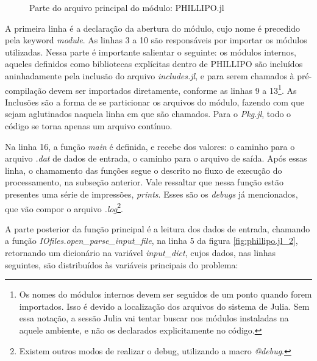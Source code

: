 \begin{figure}[hbtp]
    \caption{Parte do arquivo principal do módulo: PHILLIPO.jl}
    
    \label{fig:phillipo.jl}
\end{figure}

A primeira linha é a declaração da abertura do módulo, cujo nome é precedido pela keyword \emph{module}. As linhas 3 a 10 são responsáveis por importar os módulos utilizadas. Nessa parte é importante salientar o seguinte: os módulos internos, aqueles definidos como bibliotecas explícitas dentro de PHILLIPO são incluídos aninhadamente pela inclusão do arquivo \emph{includes.jl}, e para serem chamados à pré-compilação devem ser importados diretamente, conforme as linhas 9 a 13\footnote{Os nomes do módulos internos devem ser seguidos de um ponto quando forem importados. Isso é devido a localização dos arquivos do sistema de Julia. Sem essa notação, a sessão Julia vai tentar buscar nos módulos instaladas na aquele ambiente, e não os declarados explicitamente no código.}. As Inclusões são a forma de se particionar os arquivos do módulo, fazendo com que sejam aglutinados naquela linha em que são chamados. Para o \emph{Pkg.jl}, todo o código se torna apenas um arquivo contínuo.

Na linha 16, a função \emph{main} é definida, e recebe dos valores: o caminho para o arquivo \emph{.dat} de dados de entrada, o caminho para o arquivo de saída. Após essas linha, o chamamento das funções segue o descrito no fluxo de execução do processamento, na subseção anterior. Vale ressaltar que nessa função estão presentes uma série de impressões, \emph{prints}. Esses são os \emph{debugs} já mencionados, que vão compor o arquivo \emph{.log}\footnote{Existem outros modos de realizar o debug, utilizando a macro \emph{@debug}.}.

A parte posterior da função principal é a leitura dos dados de entrada, chamando a função \emph{IOfiles.open\_parse\_input\_file}, na linha 5 da figura \ref{fig:phillipo.jl_2}, retornando um dicionário na variável \emph{input\_dict}, cujos dados, nas linhas seguintes, são distribuídos às variáveis principais do problema:

